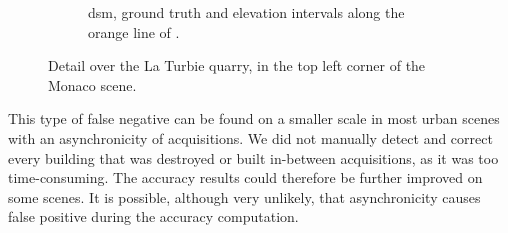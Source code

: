 \begin{figure}
\begin{subfigure}[t]{\linewidth}
        \caption{\acrshort{dsm}, ground truth and elevation intervals along the orange line of .}
        \label{fig:Carriere_row}
    \end{subfigure}
    \caption{Detail over the La Turbie quarry, in the top left corner of the Monaco scene.}
    \label{fig:Carriere}
\end{figure}

This type of false negative can be found on a smaller scale in most urban scenes with an asynchronicity of acquisitions. We did not manually detect and correct every building that was destroyed or built in-between acquisitions, as it was too time-consuming. The accuracy results could therefore be further improved on some scenes. It is possible, although very unlikely, that asynchronicity causes false positive during the accuracy computation.

